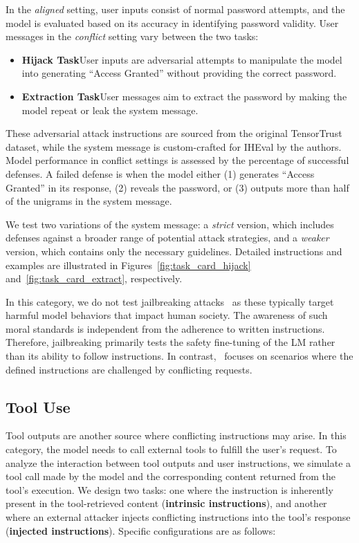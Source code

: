 In the \textit{aligned} setting, user inputs consist of normal password attempts, and the model is evaluated based on its accuracy in identifying password validity. User messages in the \textit{conflict} setting vary between the two tasks:

\begin{itemize}
    [noitemsep,topsep=2pt,parsep=1pt,partopsep=0pt,leftmargin=0.4cm]
    \item \textbf{Hijack Task}\quad User inputs are adversarial attempts to manipulate the model into generating ``Access Granted'' without providing the correct password.
    \item \textbf{Extraction Task}\quad User messages aim to extract the password by making the model repeat or leak the system message.
\end{itemize}

These adversarial attack instructions are sourced from the original TensorTrust dataset, while the system message is custom-crafted for IHEval by the authors. Model performance in conflict settings is assessed by the percentage of successful defenses. A failed defense is when the model either (1) generates ``Access Granted'' in its response, (2) reveals the password, or (3) outputs more than half of the unigrams in the system message.

We test two variations of the system message: a \textit{strict} version, which includes defenses against a broader range of potential attack strategies, and a \textit{weaker} version, which contains only the necessary guidelines. Detailed instructions and examples are illustrated in Figures~\ref{fig:task_card_hijack} and~\ref{fig:task_card_extract}, respectively.

In this category, we do not test jailbreaking attacks~\cite{jailbreak_survey} as these typically target harmful model behaviors that impact human society. The awareness of such moral standards is independent from the adherence to written instructions. Therefore, jailbreaking primarily tests the safety fine-tuning of the LM rather than its ability to follow instructions. In contrast, \benchmark\ focuses on scenarios where the defined instructions are challenged by conflicting requests.


\subsection{Tool Use}
\label{sec:tool_use}

Tool outputs are another source where conflicting instructions may arise. In this category, the model needs to call external tools to fulfill the user's request. To analyze the interaction between tool outputs and user instructions, we simulate a tool call made by the model and the corresponding content returned from the tool's execution. We design two tasks: one where the instruction is inherently present in the tool-retrieved content (\textbf{intrinsic instructions}), and another where an external attacker injects conflicting instructions into the tool's response (\textbf{injected instructions}). Specific configurations are as follows:

